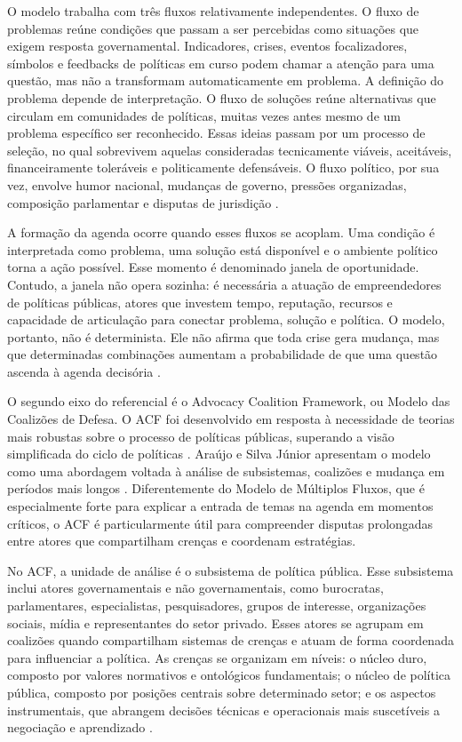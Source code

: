 \documentclass[12pt,a4paper]{article}
\begin{document}
O modelo trabalha com três fluxos relativamente independentes. O fluxo de problemas reúne condições que passam a ser percebidas como situações que exigem resposta governamental. Indicadores, crises, eventos focalizadores, símbolos e feedbacks de políticas em curso podem chamar a atenção para uma questão, mas não a transformam automaticamente em problema. A definição do problema depende de interpretação. O fluxo de soluções reúne alternativas que circulam em comunidades de políticas, muitas vezes antes mesmo de um problema específico ser reconhecido. Essas ideias passam por um processo de seleção, no qual sobrevivem aquelas consideradas tecnicamente viáveis, aceitáveis, financeiramente toleráveis e politicamente defensáveis. O fluxo político, por sua vez, envolve humor nacional, mudanças de governo, pressões organizadas, composição parlamentar e disputas de jurisdição \autocites{kingdon2003agendas}[][]{capella2022multiplos}.

A formação da agenda ocorre quando esses fluxos se acoplam. Uma condição é interpretada como problema, uma solução está disponível e o ambiente político torna a ação possível. Esse momento é denominado janela de oportunidade. Contudo, a janela não opera sozinha: é necessária a atuação de empreendedores de políticas públicas, atores que investem tempo, reputação, recursos e capacidade de articulação para conectar problema, solução e política. O modelo, portanto, não é determinista. Ele não afirma que toda crise gera mudança, mas que determinadas combinações aumentam a probabilidade de que uma questão ascenda à agenda decisória \autocites{kingdon2003agendas}[][]{capella2022multiplos}.

O segundo eixo do referencial é o Advocacy Coalition Framework, ou Modelo das Coalizões de Defesa. O ACF foi desenvolvido em resposta à necessidade de teorias mais robustas sobre o processo de políticas públicas, superando a visão simplificada do ciclo de políticas \autocite{sabatier1999theories}. Araújo e Silva Júnior apresentam o modelo como uma abordagem voltada à análise de subsistemas, coalizões e mudança em períodos mais longos \autocite{araujoSilva2022coalizoes}. Diferentemente do Modelo de Múltiplos Fluxos, que é especialmente forte para explicar a entrada de temas na agenda em momentos críticos, o ACF é particularmente útil para compreender disputas prolongadas entre atores que compartilham crenças e coordenam estratégias.

No ACF, a unidade de análise é o subsistema de política pública. Esse subsistema inclui atores governamentais e não governamentais, como burocratas, parlamentares, especialistas, pesquisadores, grupos de interesse, organizações sociais, mídia e representantes do setor privado. Esses atores se agrupam em coalizões quando compartilham sistemas de crenças e atuam de forma coordenada para influenciar a política. As crenças se organizam em níveis: o núcleo duro, composto por valores normativos e ontológicos fundamentais; o núcleo de política pública, composto por posições centrais sobre determinado setor; e os aspectos instrumentais, que abrangem decisões técnicas e operacionais mais suscetíveis a negociação e aprendizado \autocites{sabatier1999theories}[][]{araujoSilva2022coalizoes}.
\end{document}
